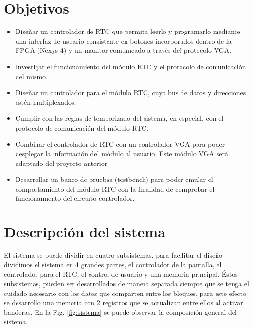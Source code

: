 \documentclass[12pt,a4paper]{article}
\begin{document}
		\section{Objetivos}
		\begin{itemize}
			\item Diseñar un controlador de RTC que permita leerlo y programarlo mediante una interfaz de usuario consistente en botones incorporados dentro de la FPGA (Nexys 4) y un monitor comunicado a través del protocolo VGA.
			\item Investigar el funcionamiento del módulo RTC y el protocolo de comunicación del mismo.
			\item Diseñar un controlador para el módulo RTC, cuyo bus de datos y direcciones estén multiplexados.
			\item Cumplir con las reglas de temporizado del sistema, en especial, con el protocolo de comunicación del módulo RTC.
			\item Combinar el controlador de RTC con un controlador VGA para poder desplegar la información del módulo al usuario. Este módulo VGA será adaptado del proyecto anterior.
			\item Desarrollar un banco de pruebas (testbench) para poder emular el comportamiento del módulo RTC con la finalidad de comprobar el funcionamiento del circuito controlador.
		\end{itemize}
		
		\section{Descripción del sistema}
		El sistema se puede dividir en cuatro subsistemas, para facilitar el diseño dividimos el sistema en 4 grandes partes, el controlador de la pantalla, el controlador para el RTC, el control de usuario y  una memoria principal. Éstos subsistemas, pueden ser desarrollados de manera separada siempre que se tenga el cuidado necesario con los datos que comparten entre los bloques, para este efecto se desarrollo una memoria con 2 registros que se actualizan entre ellos al activar banderas. En la Fig. \ref{fig:sistema} se puede observar la composición general del sistema. \\[2ex]
		
\end{document}
